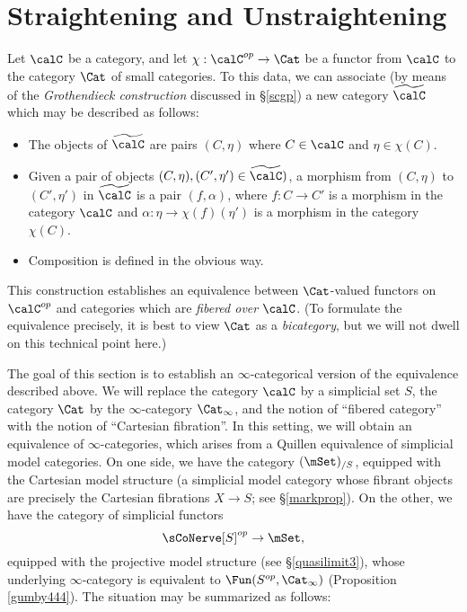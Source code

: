\section{Straightening and Unstraightening}\label{strsec}

\setcounter{theorem}{0}

Let $\calC$ be a category, and let $\chi: \calC^{op} \rightarrow \Cat$
be a functor from $\calC$ to the category $\Cat$ of small categories.
To this data, we can associate (by means of the {\it Grothendieck construction} discussed in \S \ref{scgp}) a new category $\widetilde{\calC}$ which may be described as follows:
\begin{itemize}
\item The objects of $\widetilde{\calC}$ are pairs $(C, \eta)$ where
$C \in \calC$ and $\eta \in \chi(C)$.
\item Given a pair of objects $(C, \eta), (C', \eta') \in \widetilde{\calC})$, a morphism
from $(C, \eta)$ to $(C', \eta')$ in $\widetilde{\calC}$ is a pair $(f, \alpha)$, where
$f: C \rightarrow C'$ is a morphism in the category $\calC$ and $\alpha: \eta \rightarrow \chi(f)(\eta')$ is a morphism in the category $\chi(C)$.
\item Composition is defined in the obvious way.
\end{itemize}
This construction establishes an equivalence between
$\Cat$-valued functors on $\calC^{op}$ and categories which are {\it fibered over
$\calC$}. (To formulate the equivalence precisely, it is best to view $\Cat$ as
a {\it bicategory}, but we will not dwell on this technical point here.)

The goal of this section is to establish an $\infty$-categorical version of the equivalence described above. We will replace the category $\calC$ by a simplicial set $S$, the category $\Cat$ by the $\infty$-category
$\Cat_{\infty}$, and the notion of ``fibered category'' with the notion of
``Cartesian fibration''. In this setting, we will obtain an equivalence of $\infty$-categories, which arises from a Quillen equivalence of simplicial model categories. On one side, we have the category
$(\mSet)_{/S}$, equipped with the Cartesian model structure (a simplicial model category whose fibrant objects are precisely the Cartesian fibrations $X \rightarrow S$; see \S \ref{markprop}). On the other, we have the category of simplicial functors
$$ \sCoNerve[S]^{op} \rightarrow \mSet,$$
equipped with the projective model structure (see \S \ref{quasilimit3}), whose underlying $\infty$-category is equivalent to $\Fun(S^{op}, \Cat_{\infty})$ (Proposition \ref{gumby444}).
The situation may be summarized as follows:

